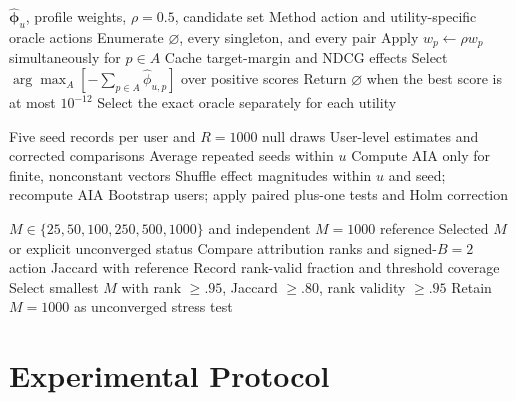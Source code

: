 \documentclass[pdflatex,sn-basic,Numbered]{sn-jnl}
\begin{document}
\begin{algorithm}[t]
\caption{Signed action selection and exact budget-two oracle}
\label{alg:actions}
\begin{algorithmic}[1]
\Require $\hat{\boldsymbol\phi}_u$, profile weights, $\rho=0.5$, candidate set
\Ensure Method action and utility-specific oracle actions
\State Enumerate $\varnothing$, every singleton, and every pair
\State Apply $w_p\gets\rho w_p$ simultaneously for $p\in A$
\State Cache target-margin and NDCG effects
\EndFor
\State Select $\arg\max_A[-\sum_{p\in A}\hat\phi_{u,p}]$ over positive scores
\State Return $\varnothing$ when the best score is at most $10^{-12}$
\State Select the exact oracle separately for each utility
\end{algorithmic}
\end{algorithm}

\begin{algorithm}[t]
\caption{Distinct-user inference and AIA null}
\label{alg:inference}
\begin{algorithmic}[1]
\Require Five seed records per user and $R=1000$ null draws
\Ensure User-level estimates and corrected comparisons
\State Average repeated seeds within $u$
\State Compute AIA only for finite, nonconstant vectors
\State Shuffle effect magnitudes within $u$ and seed; recompute AIA
\EndFor
\EndFor
\State Bootstrap users; apply paired plus-one tests and Holm correction
\end{algorithmic}
\end{algorithm}

\begin{algorithm}[t]
\caption{Independent convergence selection}
\label{alg:convergence}
\begin{algorithmic}[1]
\Require $M\in\{25,50,100,250,500,1000\}$ and independent $M=1000$ reference
\Ensure Selected $M$ or explicit unconverged status
\State Compare attribution ranks and signed-$B=2$ action Jaccard with reference
\State Record rank-valid fraction and threshold coverage
\EndFor
\State Select smallest $M$ with rank $\ge.95$, Jaccard $\ge.80$, rank validity $\ge.95$
\State Retain $M=1000$ as unconverged stress test\EndIf
\end{algorithmic}
\end{algorithm}

\section{Experimental Protocol}
\end{document}
